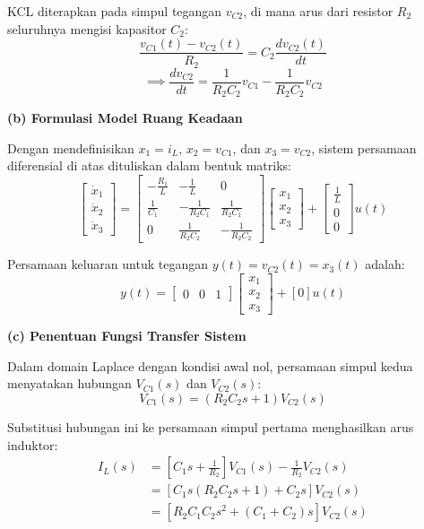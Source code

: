 \documentclass[11pt,a4paper]{article}
\begin{document}
KCL diterapkan pada simpul tegangan $v_{C2}$, di mana arus dari resistor $R_2$ seluruhnya mengisi kapasitor $C_2$:
$$\frac{v_{C1}(t) - v_{C2}(t)}{R_2} = C_2 \frac{dv_{C2}(t)}{dt}$$
$$\implies \frac{dv_{C2}}{dt} = \frac{1}{R_2 C_2} v_{C1} - \frac{1}{R_2 C_2} v_{C2}$$

\textbf{(b) Formulasi Model Ruang Keadaan}

Dengan mendefinisikan $x_1 = i_L$, $x_2 = v_{C1}$, dan $x_3 = v_{C2}$, sistem persamaan diferensial di atas dituliskan dalam bentuk matriks:
$$\begin{bmatrix} \dot{x}_1 \\ \dot{x}_2 \\ \dot{x}_3 \end{bmatrix} = \begin{bmatrix} -\frac{R_1}{L} & -\frac{1}{L} & 0 \\ \frac{1}{C_1} & -\frac{1}{R_2 C_1} & \frac{1}{R_2 C_1} \\ 0 & \frac{1}{R_2 C_2} & -\frac{1}{R_2 C_2} \end{bmatrix} \begin{bmatrix} x_1 \\ x_2 \\ x_3 \end{bmatrix} + \begin{bmatrix} \frac{1}{L} \\ 0 \\ 0 \end{bmatrix} u(t)$$

Persamaan keluaran untuk tegangan $y(t) = v_{C2}(t) = x_3(t)$ adalah:
$$y(t) = \begin{bmatrix} 0 & 0 & 1 \end{bmatrix} \begin{bmatrix} x_1 \\ x_2 \\ x_3 \end{bmatrix} + [0] u(t)$$

\textbf{(c) Penentuan Fungsi Transfer Sistem}

Dalam domain Laplace dengan kondisi awal nol, persamaan simpul kedua menyatakan hubungan $V_{C1}(s)$ dan $V_{C2}(s)$:
$$V_{C1}(s) = (R_2 C_2 s + 1) V_{C2}(s)$$

Substitusi hubungan ini ke persamaan simpul pertama menghasilkan arus induktor:
\begin{align*}
    I_L(s) &= \left[ C_1 s + \frac{1}{R_2} \right] V_{C1}(s) - \frac{1}{R_2} V_{C2}(s) \\
    &= \left[ C_1 s(R_2 C_2 s + 1) + C_2 s \right] V_{C2}(s) \\
    &= \left[ R_2 C_1 C_2 s^2 + (C_1 + C_2) s \right] V_{C2}(s)
\end{align*}
\end{document}
